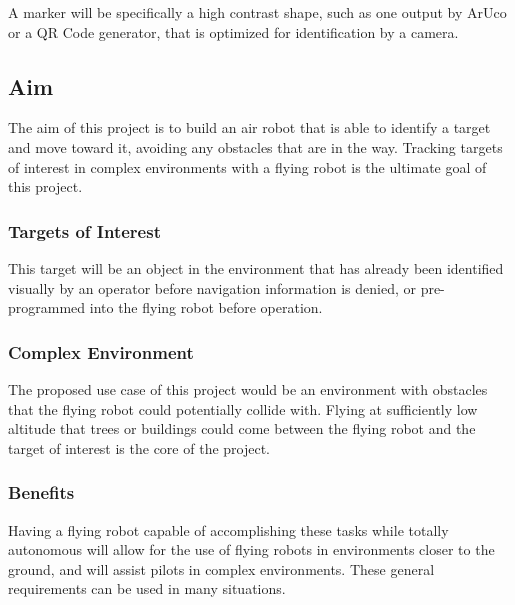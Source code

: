 \documentclass{article}
\begin{document}
		A marker will be specifically a high contrast shape, such as one output by ArUco or a QR Code generator, that is optimized for identification by a camera.
		
	\subsection{Aim}
	
	The aim of this project is to build an air robot that is able to identify a target and move toward it, avoiding any obstacles that are in the way. Tracking targets of interest in complex environments with a flying robot is the ultimate goal of this project. 
	
		\subsubsection{Targets of Interest}
		
		This target will be an object in the environment that has already been identified visually by an operator before navigation information is denied, or pre-programmed into the flying robot before operation.
		
		\subsubsection{Complex Environment}
		
		The proposed use case of this project would be an environment with obstacles that the flying robot could potentially collide with. Flying at sufficiently low altitude that trees or buildings could come between the flying robot and the target of interest is the core of the project.
		
		\subsubsection{Benefits}
		
		Having a flying robot capable of accomplishing these tasks while totally autonomous will allow for the use of flying robots in environments closer to the ground, and will assist pilots in complex environments. These general requirements can be used in many situations.
		
\end{document}
